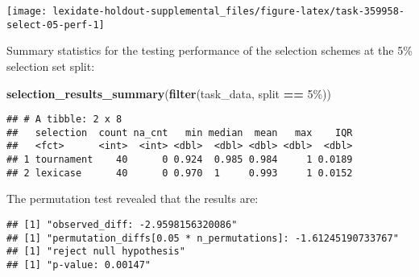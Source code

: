 \documentclass[
]{book}
\newenvironment{Shaded}{\begin{snugshade}}{\end{snugshade}}
\newcommand{\AttributeTok}[1]{\textcolor[rgb]{0.13,0.29,0.53}{#1}}
\newcommand{\DecValTok}[1]{\textcolor[rgb]{0.00,0.00,0.81}{#1}}
\newcommand{\FunctionTok}[1]{\textcolor[rgb]{0.13,0.29,0.53}{\textbf{#1}}}
\newcommand{\NormalTok}[1]{#1}
\newcommand{\OtherTok}[1]{\textcolor[rgb]{0.56,0.35,0.01}{#1}}
\newcommand{\SpecialCharTok}[1]{\textcolor[rgb]{0.81,0.36,0.00}{\textbf{#1}}}
\newcommand{\StringTok}[1]{\textcolor[rgb]{0.31,0.60,0.02}{#1}}
\begin{document}
\texttt{[image: lexidate-holdout-supplemental\_files/figure-latex/task-359958-select-05-perf-1]}

Summary statistics for the testing performance of the selection schemes at the 5\% selection set split:

\begin{Shaded}
\begin{Highlighting}[]
\FunctionTok{selection\_results\_summary}\NormalTok{(}\FunctionTok{filter}\NormalTok{(task\_data, split }\SpecialCharTok{==} \StringTok{\textquotesingle{}5\%\textquotesingle{}}\NormalTok{))}
\end{Highlighting}
\end{Shaded}

\begin{verbatim}
## # A tibble: 2 x 8
##   selection  count na_cnt   min median  mean   max    IQR
##   <fct>      <int>  <int> <dbl>  <dbl> <dbl> <dbl>  <dbl>
## 1 tournament    40      0 0.924  0.985 0.984     1 0.0189
## 2 lexicase      40      0 0.970  1     0.993     1 0.0152
\end{verbatim}

The permutation test revealed that the results are:

\begin{Shaded}
\end{Shaded}

\begin{verbatim}
## [1] "observed_diff: -2.9598156320086"
## [1] "permutation_diffs[0.05 * n_permutations]: -1.61245190733767"
## [1] "reject null hypothesis"
## [1] "p-value: 0.00147"
\end{verbatim}
\end{document}
